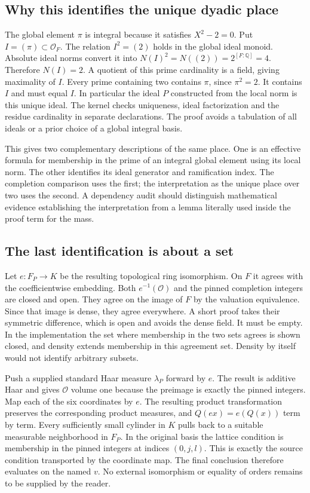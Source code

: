 \documentclass[12pt,letterpaper]{article}
\newcommand{\code}[1]{\texttt{\detokenize{#1}}}
\begin{document}
\subsection{Why this identifies the unique dyadic place}
The global element $\pi$ is integral because it satisfies $X^2-2=0$. Put $I=(\pi)\subset\mathcal O_F$. The relation $I^2=(2)$ holds in the global ideal monoid. Absolute ideal norms convert it into $N(I)^2=N((2))=2^{[F:\mathbb Q]}=4$. Therefore $N(I)=2$. A quotient of this prime cardinality is a field, giving maximality of $I$. Every prime containing two contains $\pi$, since $\pi^2=2$. It contains $I$ and must equal $I$. In particular the ideal $P$ constructed from the local norm is this unique ideal. The kernel checks uniqueness, ideal factorization and the residue cardinality in separate declarations. The proof avoids a tabulation of all ideals or a prior choice of a global integral basis.
\par
This gives two complementary descriptions of the same place. One is an effective formula for membership in the prime of an integral global element using its local norm. The other identifies its ideal generator and ramification index. The completion comparison uses the first; the interpretation as the unique place over two uses the second. A dependency audit should distinguish mathematical evidence establishing the interpretation from a lemma literally used inside the proof term for the mass.
\subsection{The last identification is about a set}
Let $e:F_P\to K$ be the resulting topological ring isomorphism. On $F$ it agrees with the coefficientwise embedding. Both $e^{-1}(\mathcal O)$ and the pinned completion integers are closed and open. They agree on the image of $F$ by the valuation equivalence. Since that image is dense, they agree everywhere. A short proof takes their symmetric difference, which is open and avoids the dense field. It must be empty. In the implementation the set where membership in the two sets agrees is shown closed, and density extends membership in this agreement set. Density by itself would not identify arbitrary subsets.
\par
Push a supplied standard Haar measure $\lambda_P$ forward by $e$. The result is additive Haar and gives $\mathcal O$ volume one because the preimage is exactly the pinned integers. Map each of the six coordinates by $e$. The resulting product transformation preserves the corresponding product measures, and $Q(e x)=e(Q(x))$ term by term. Every sufficiently small cylinder in $K$ pulls back to a suitable measurable neighborhood in $F_P$. In the original basis the lattice condition is membership in the pinned integers at indices $(0,j,l)$. This is exactly the source condition transported by the coordinate map. The final conclusion therefore evaluates \code{latV gb v} on the named $v$. No external isomorphism or equality of orders remains to be supplied by the reader.
\end{document}
